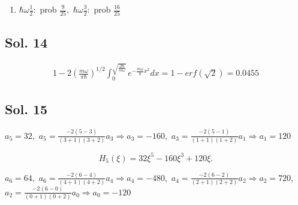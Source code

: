 \begin{enumerate}
    \begin{align*}
        \langle p\rangle
        = & i\sqrt{\frac{\hbar m\omega}{2}}
        \int
        (\frac{3}{5}\psi_0(x)e^{i\omega t/2} + 
    \frac{4}{5}\psi_1(x)e^{i3\omega t/2})
    (\hat{a}_+ - \hat{a}_-)
    (\frac{3}{5}\psi_0(x)e^{-i\omega t/2} - 
    \frac{4}{5}\psi_1(x)e^{-i3\omega t/2})
    dx\\
    = & 
    i\sqrt{\frac{\hbar m\omega}{2}}
    \int
        (\frac{3}{5}\psi_0(x)e^{i\omega t/2} + 
    \frac{4}{5}\psi_1(x)e^{i3\omega t/2})
    (\frac{3}{5}\psi_1(x)e^{-i\omega t/2} -
    \frac{4}{5}\psi_0(x)e^{-i3\omega t/2})
    dx\\
    =& i\sqrt{\frac{\hbar m\omega}{2}}
    (-\frac{12}{25}e^{-i\omega t} + \frac{12}{25}e^{i\omega t})\\
    = & -\sqrt{\frac{\hbar m\omega}{2}}
    \frac{24}{25}\sin\omega t
    \end{align*}

    $$
    \frac{d\langle p\rangle}{dt} = -\sqrt{\frac{\hbar m\omega}{2}}
    \frac{24}{25}\omega\cos\omega t
    $$
    $$
    \langle - \frac{\partial V}{\partial x}\rangle = 
    -m\omega^2\langle x\rangle = 
     -\sqrt{\frac{\hbar m\omega}{2}}
    \frac{24}{25}\omega\cos\omega t
    $$
\item 
    $\hbar\omega\frac{1}{2}:$ prob $\frac{9}{25},$ $\hbar\omega\frac{3}{2}:$ prob $\frac{16}{25}$
    
\end{enumerate}

\subsection*{Sol. 14}
\begin{align*}
    1-2(\frac{m\omega}{\pi\hbar})^{1/2}\int_0^{\sqrt{\frac{2\hbar}{m\omega}}}
    e^{-\frac{m\omega}{\hbar}x^2}dx
    =1-erf(\sqrt{2})=0.0455
\end{align*}

\subsection*{Sol. 15}
$a_5=32,$ $
a_5=\frac{-2(5-3)}{(3+1)(3+2)}a_3\Rightarrow a_3 = -160,
$
$
a_3=\frac{-2(5-1)}{(1+1)(1+2)}a_1\Rightarrow a_1=120
$

$$H_5(\xi) = 32\xi^5-160\xi^3+120\xi.$$


$a_6=64,$ $
a_6=\frac{-2(6-4)}{(4+1)(4+2)}a_4\Rightarrow a_4 = -480,
$
$
a_4=\frac{-2(6-2)}{(2+1)(2+2)}a_2\Rightarrow a_2=720,
$
$
a_2=\frac{-2(6-0)}{(0+1)(0+2)}a_0\Rightarrow a_0=-120
$

